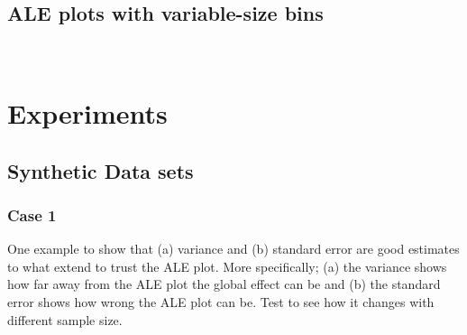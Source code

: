 \documentclass[wcp]{jmlr}
\newcommand{\1}{\mathbbm{1}}
\begin{document}
\subsection{ALE plots with variable-size bins}

\newpage
~\newpage

\section{Experiments}

\subsection{Synthetic Data sets}


\subsubsection{Case 1}

One example to show that (a) variance and (b) standard error are good
estimates to what extend to trust the ALE plot. More specifically; (a)
the variance shows how far away from the ALE plot the global effect
can be and (b) the standard error shows how wrong the ALE plot can be.
Test to see how it changes with different sample size.
\end{document}
